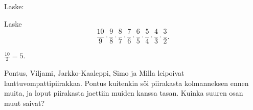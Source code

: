 \begin{tehtavasivu}
        \begin{tehtava}
        
        \begin{alakohdat}
        \end{alakohdat}
            \begin{vastaus}		
        		\begin{alakohdat}
        		\end{alakohdat}
            \end{vastaus}
        \end{tehtava}
        
        \begin{tehtava} Laske:
	\begin{alakohdatrivi}
	\end{alakohdatrivi}
	\begin{vastaus}
		\begin{alakohdatrivi}
			\alakohta{$\frac{20}{9}$}
			\alakohta{$\frac{18}{35}$}
			\alakohta{$\frac{1}{2}$}
		\end{alakohdatrivi}
	\end{vastaus}
\end{tehtava}

\begin{tehtava}
    Laske 
    \[ \frac{10}{9}\cdot \frac{9}{8}\cdot \frac{8}{7}\cdot \frac{7}{6}\cdot \frac{6}{5}
    \cdot \frac{5}{4}\cdot \frac{4}{3}\cdot \frac{3}{2}. \]
    \begin{vastaus}
		$\frac{10}{2}=5$.
    \end{vastaus}        
\end{tehtava}
    
    \begin{tehtava} %
        Pontus, Viljami, Jarkko-Kaaleppi, Simo ja Milla leipoivat lanttuvompattipiirakkaa.
        Pontus kuitenkin söi piirakasta kolmanneksen ennen muita, ja loput piirakasta
        jaettiin muiden kanssa tasan. Kuinka suuren osan muut saivat?
        

\end{tehtava}
\end{tehtavasivu}
